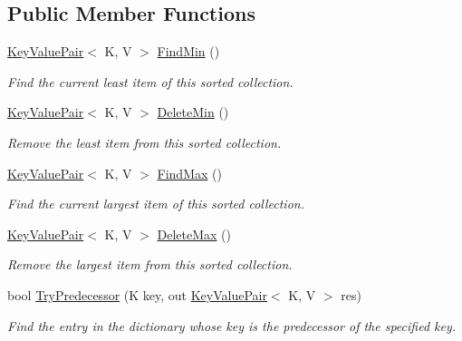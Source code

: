 \subsection*{Public Member Functions}
\begin{DoxyCompactItemize}
\item 
\hyperlink{struct_c5_1_1_key_value_pair}{Key\+Value\+Pair}$<$ K, V $>$ \hyperlink{interface_c5_1_1_i_sorted_dictionary_afa487d42d47f5b3730914f182880403f}{Find\+Min} ()
\begin{DoxyCompactList}\small\item\em Find the current least item of this sorted collection. \end{DoxyCompactList}\item 
\hyperlink{struct_c5_1_1_key_value_pair}{Key\+Value\+Pair}$<$ K, V $>$ \hyperlink{interface_c5_1_1_i_sorted_dictionary_a4b4c8891f922d9f2d66f4070dab9bd0a}{Delete\+Min} ()
\begin{DoxyCompactList}\small\item\em Remove the least item from this sorted collection. \end{DoxyCompactList}\item 
\hyperlink{struct_c5_1_1_key_value_pair}{Key\+Value\+Pair}$<$ K, V $>$ \hyperlink{interface_c5_1_1_i_sorted_dictionary_ae532ee9a31de850bac9f115509486225}{Find\+Max} ()
\begin{DoxyCompactList}\small\item\em Find the current largest item of this sorted collection. \end{DoxyCompactList}\item 
\hyperlink{struct_c5_1_1_key_value_pair}{Key\+Value\+Pair}$<$ K, V $>$ \hyperlink{interface_c5_1_1_i_sorted_dictionary_ab06a9effc3f2da79a4e446f5aa078d3b}{Delete\+Max} ()
\begin{DoxyCompactList}\small\item\em Remove the largest item from this sorted collection. \end{DoxyCompactList}\item 
bool \hyperlink{interface_c5_1_1_i_sorted_dictionary_a6af39c1f97f7fa86559edb9fd87975b8}{Try\+Predecessor} (K key, out \hyperlink{struct_c5_1_1_key_value_pair}{Key\+Value\+Pair}$<$ K, V $>$ res)
\begin{DoxyCompactList}\small\item\em Find the entry in the dictionary whose key is the predecessor of the specified key. \end{DoxyCompactList}\item 

\end{DoxyCompactItemize}
